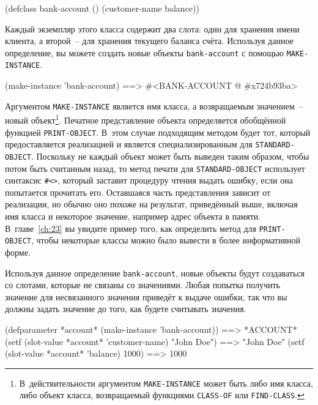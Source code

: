 \begin{myverb}
(defclass bank-account ()
  (customer-name
   balance))
\end{myverb}

Каждый экземпляр этого класса содержит два слота: один для хранения имени клиента, а
второй~-- для хранения текущего баланса счёта.  Используя данное определение, вы можете
создать новые объекты \lstinline{bank-account} с помощью \lstinline{MAKE-INSTANCE}.

\begin{myverb}
(make-instance 'bank-account) ==> #<BANK-ACCOUNT @ #x724b93ba>
\end{myverb}

Аргументом \lstinline{MAKE-INSTANCE} является имя класса, а возвращаемым значением~-- новый
объект\footnote{В~действительности аргументом \lstinline{MAKE-INSTANCE} может быть либо имя
  класса, либо объект класса, возвращаемый функциями \lstinline{CLASS-OF} или
  \lstinline{FIND-CLASS}.}\hspace{\footnotenegspace}.  Печатное представление объекта определяется обобщённой функцией
\lstinline{PRINT-OBJECT}.  В~этом случае подходящим методом будет тот, который предоставляется
реализацией и является специализированным для \lstinline{STANDARD-OBJECT}.  Поскольку не каждый объект
может быть выведен таким образом, чтобы потом быть считанным назад, то метод печати для
\lstinline{STANDARD-OBJECT} использует синтаксис \lstinline!#<>!, который заставит процедуру
чтения выдать ошибку, если она попытается прочитать его.  Оставшаяся часть представления
зависит от реализации, но обычно оно похоже на результат, приведённый выше, включая имя
класса и некоторое значение, например адрес объекта в памяти.  В~главе~\ref{ch:23} вы
увидите пример того, как определить метод для \lstinline{PRINT-OBJECT}, чтобы некоторые классы
можно было вывести в более информативной форме.

Используя данное определение \lstinline{bank-account}, новые объекты будут создаваться со
слотами, которые не связаны со значениями.  Любая попытка получить значение для
несвязанного значения приведёт к выдаче ошибки, так что вы должны задать значение до того,
как будете считывать значения.

\begin{myverb}
(defparameter *account* (make-instance 'bank-account))  ==> *ACCOUNT*
(setf (slot-value *account* 'customer-name) "John Doe") ==> "John Doe"
(setf (slot-value *account* 'balance) 1000)             ==> 1000
\end{myverb}

